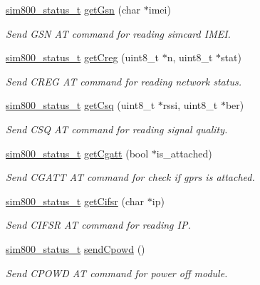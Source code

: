 \begin{DoxyCompactItemize}
\hyperlink{sim800_8h_a3d1eeaa095df003ea28385b81a134b27}{sim800\+\_\+status\+\_\+t} \hyperlink{classSIM800_a9bbdd9fd81aaa798f6cc8ae9dfba0dce}{get\+Gsn} (char $\ast$imei)
\begin{DoxyCompactList}\small\item\em Send G\+SN AT command for reading simcard I\+M\+EI. \end{DoxyCompactList}\item 
\hyperlink{sim800_8h_a3d1eeaa095df003ea28385b81a134b27}{sim800\+\_\+status\+\_\+t} \hyperlink{classSIM800_acc33ebd53d7632af0231fe5762700a6c}{get\+Creg} (uint8\+\_\+t $\ast$n, uint8\+\_\+t $\ast$stat)
\begin{DoxyCompactList}\small\item\em Send C\+R\+EG AT command for reading network status. \end{DoxyCompactList}\item 
\hyperlink{sim800_8h_a3d1eeaa095df003ea28385b81a134b27}{sim800\+\_\+status\+\_\+t} \hyperlink{classSIM800_a4512a8ea233080900c43cc42fe8a4dfb}{get\+Csq} (uint8\+\_\+t $\ast$rssi, uint8\+\_\+t $\ast$ber)
\begin{DoxyCompactList}\small\item\em Send C\+SQ AT command for reading signal quality. \end{DoxyCompactList}\item 
\hyperlink{sim800_8h_a3d1eeaa095df003ea28385b81a134b27}{sim800\+\_\+status\+\_\+t} \hyperlink{classSIM800_a01c081285a1c61b068f97f06fb2004d9}{get\+Cgatt} (bool $\ast$is\+\_\+attached)
\begin{DoxyCompactList}\small\item\em Send C\+G\+A\+TT AT command for check if gprs is attached. \end{DoxyCompactList}\item 
\hyperlink{sim800_8h_a3d1eeaa095df003ea28385b81a134b27}{sim800\+\_\+status\+\_\+t} \hyperlink{classSIM800_a5313d75fb7510fe8b84b89def3b35096}{get\+Cifsr} (char $\ast$ip)
\begin{DoxyCompactList}\small\item\em Send C\+I\+F\+SR AT command for reading IP. \end{DoxyCompactList}\item 
\hyperlink{sim800_8h_a3d1eeaa095df003ea28385b81a134b27}{sim800\+\_\+status\+\_\+t} \hyperlink{classSIM800_ad8e19f34a392ac9b982fba48aed2d83e}{send\+Cpowd} ()
\begin{DoxyCompactList}\small\item\em Send C\+P\+O\+WD AT command for power off module. \end{DoxyCompactList}\item 

\end{DoxyCompactItemize}
